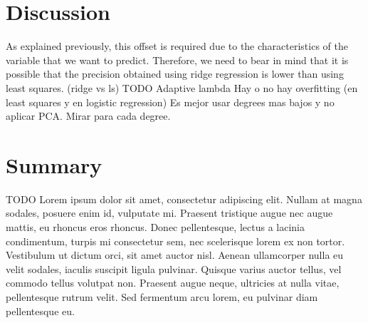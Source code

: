 \documentclass[10pt,conference,compsocconf]{IEEEtran}
\begin{document}
\section{Discussion}
\label{sec:discussion}
 As explained previously, this offset is required due to the characteristics of the variable that we want to predict.  Therefore, we need to bear in mind that it is possible that the precision obtained using ridge regression is lower than using least squares. (ridge vs ls)
TODO Adaptive lambda
Hay o no hay overfitting (en least squares y en logistic regression)
Es mejor usar degrees mas bajos y no aplicar PCA. Mirar para cada degree.

\section{Summary}
\label{sec:tips-writing}

TODO Lorem ipsum dolor sit amet, consectetur adipiscing elit. Nullam at magna sodales, posuere enim id, vulputate mi. Praesent tristique augue nec augue mattis, eu rhoncus eros rhoncus. Donec pellentesque, lectus a lacinia condimentum, turpis mi consectetur sem, nec scelerisque lorem ex non tortor. Vestibulum ut dictum orci, sit amet auctor nisl. Aenean ullamcorper nulla eu velit sodales, iaculis suscipit ligula pulvinar. Quisque varius auctor tellus, vel commodo tellus volutpat non. Praesent augue neque, ultricies at nulla vitae, pellentesque rutrum velit. Sed fermentum arcu lorem, eu pulvinar diam pellentesque eu.



\end{document}
